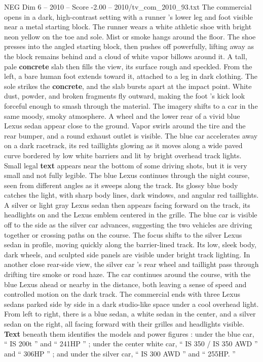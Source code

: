 \begin{textsample}{NEG Dim 6 – 2010 – Score -2.00 – 2010/tv\_com\_2010\_93.txt}  \label{ex:f6_neg_007}
The commercial opens in a dark, high-contrast setting with a runner ’s lower leg and foot visible near a metal starting block.
The runner wears a white athletic shoe with bright neon yellow on the toe and sole.
Mist or smoke hangs around the floor.
The shoe presses into the angled starting block, then pushes off powerfully, lifting away as the block remains behind and a cloud of white vapor billows around it.
A tall, pale \textbf{concrete} slab then fills the view, its surface rough and speckled.
From the left, a bare human foot extends toward it, attached to a leg in dark clothing.
The sole strikes the \textbf{concrete}, and the slab bursts apart at the impact point.
White dust, powder, and broken fragments fly outward, making the foot ’s kick look forceful enough to smash through the material.
The imagery shifts to a car in the same moody, smoky atmosphere.
A wheel and the lower rear of a vivid blue Lexus sedan appear close to the ground.
Vapor swirls around the tire and the rear bumper, and a round exhaust outlet is visible.
The blue car accelerates away on a dark racetrack, its red taillights glowing as it moves along a wide paved curve bordered by low white barriers and lit by bright overhead track lights.
Small legal \textbf{text} appears near the bottom of some driving shots, but it is very small and not fully legible.
The blue Lexus continues through the night course, seen from different angles as it sweeps along the track.
Its glossy blue body catches the light, with sharp body lines, dark windows, and angular red taillights.
A silver or light gray Lexus sedan then appears facing forward on the track, its headlights on and the Lexus emblem centered in the grille.
The blue car is visible off to the side as the silver car advances, suggesting the two vehicles are driving together or crossing paths on the course.
The focus shifts to the silver Lexus sedan in profile, moving quickly along the barrier-lined track.
Its low, sleek body, dark wheels, and sculpted side panels are visible under bright track lighting.
In another close rear-side view, the silver car ’s rear wheel and taillight pass through drifting tire smoke or road haze.
The car continues around the course, with the blue Lexus ahead or nearby in the distance, both leaving a sense of speed and controlled motion on the dark track.
The commercial ends with three Lexus sedans parked side by side in a dark studio-like space under a cool overhead light.
From left to right, there is a blue sedan, a white sedan in the center, and a silver sedan on the right, all facing forward with their grilles and headlights visible. \textbf{Text} beneath them identifies the models and power figures : under the blue car, “ IS 200t ” and “ 241HP ” ; under the center white car, “ IS 350 / IS 350 AWD ” and “ 306HP ” ; and under the silver car, “ IS 300 AWD ” and “ 255HP. ”

\end{textsample}
